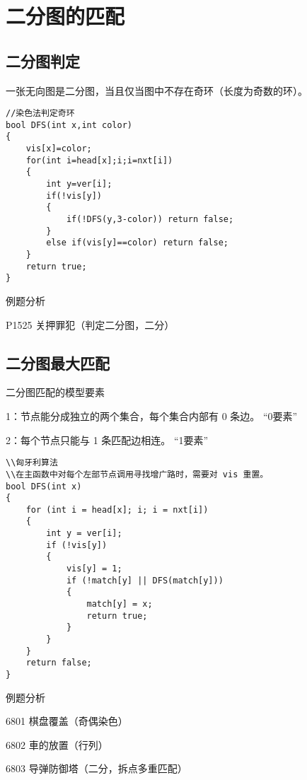 \section{二分图的匹配}
\subsection{二分图判定}
    一张无向图是二分图，当且仅当图中不存在奇环（长度为奇数的环）。
\begin{lstlisting}
//染色法判定奇环
bool DFS(int x,int color)
{
    vis[x]=color;
    for(int i=head[x];i;i=nxt[i])
    {
        int y=ver[i];
        if(!vis[y])
        {
            if(!DFS(y,3-color)) return false;
        }
        else if(vis[y]==color) return false;
    }
    return true;
}
\end{lstlisting}

例题分析

P1525 关押罪犯（判定二分图，二分）

\subsection{二分图最大匹配}
二分图匹配的模型要素

1：节点能分成独立的两个集合，每个集合内部有 0 条边。 “0要素”

2：每个节点只能与 1 条匹配边相连。 “1要素”
\begin{lstlisting}
\\匈牙利算法
\\在主函数中对每个左部节点调用寻找增广路时，需要对 vis 重置。
bool DFS(int x)
{
    for (int i = head[x]; i; i = nxt[i])
    {
        int y = ver[i];
        if (!vis[y])
        {
            vis[y] = 1;
            if (!match[y] || DFS(match[y]))
            {
                match[y] = x;
                return true;
            }
        }
    }
    return false;
}
\end{lstlisting}

例题分析

6801 棋盘覆盖（奇偶染色）

6802 車的放置（行列）

6803 导弹防御塔（二分，拆点多重匹配）

